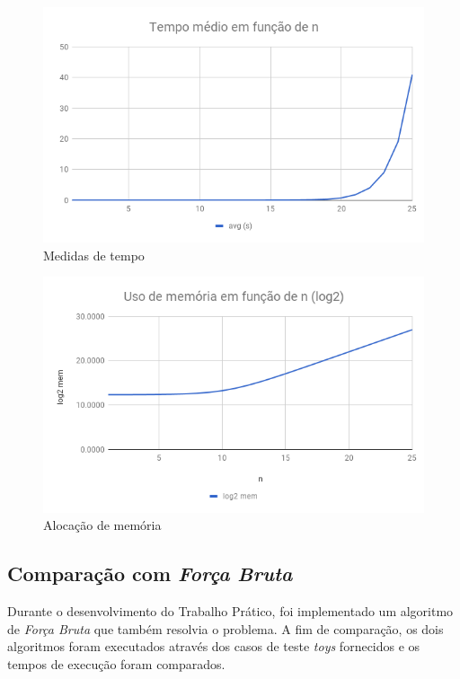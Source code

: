 \documentclass[10pt,a4paper]{article}
\begin{document}
	\begin{figure}[H]
		\centering
		\caption{Medidas de tempo}
		\label{fig_tempo}
		\includegraphics[scale=0.50]{tempo_medio}
	\end{figure}

	\begin{figure}[H]
		\centering
		\caption{Alocação de memória}
		\label{fig_alocacao}
		\includegraphics[scale=0.50]{alocacao_memoria}
	\end{figure}

	\subsection{Comparação com \emph{Força Bruta}}

	Durante o desenvolvimento do Trabalho Prático, foi implementado um algoritmo de \emph{Força Bruta} que também resolvia o problema. A fim de comparação, os dois algoritmos foram executados através dos casos de teste \emph{toys} fornecidos e os tempos de execução foram comparados.
\end{document}
